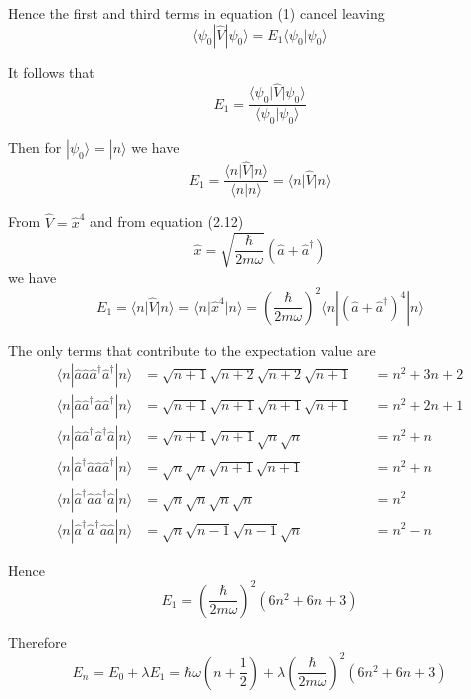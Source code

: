 \documentclass[12pt]{article}
\begin{document}
Hence the first and third terms in equation (1) cancel leaving
\begin{equation*}
\langle\psi_0|\hat V|\psi_0\rangle
=E_1\langle\psi_0|\psi_0\rangle
\end{equation*}

It follows that
\begin{equation*}
E_1=\frac{\langle\psi_0\vert\hat V\vert\psi_0\rangle}{\langle\psi_0\vert\psi_0\rangle}
\end{equation*}

Then for $|\psi_0\rangle=|n\rangle$ we have
\begin{equation*}
E_1=\frac{\langle n\vert\hat V\vert n\rangle}{\langle n\vert n\rangle}
=\langle n\vert\hat V\vert n\rangle
\end{equation*}

From $\hat V=\hat x^4$ and from equation (2.12)
\begin{equation*}
\hat x=\sqrt{\frac{\hbar}{2m\omega}}\left(\hat a+\hat a^\dag\right)
\tag{2.12}
\end{equation*}
we have
\begin{equation*}
E_1=\langle n\vert\hat V\vert n\rangle
=\langle n\vert\hat x^4\vert n\rangle
=\left(\frac{\hbar}{2m\omega}\right)^2
\langle n|\left(\hat a+\hat a^\dag\right)^4|n\rangle
\end{equation*}

The only terms that contribute to the expectation value are
\begin{align*}
\langle n|\hat a\hat a\hat a^\dag\hat a^\dag|n\rangle
&=\sqrt{n+1}\sqrt{n+2}\sqrt{n+2}\sqrt{n+1}
& {}&=n^2+3n+2
\\
\langle n|\hat a\hat a^\dag\hat a\hat a^\dag|n\rangle
&=\sqrt{n+1}\sqrt{n+1}\sqrt{n+1}\sqrt{n+1}
& {}&=n^2+2n+1
\\
\langle n|\hat a\hat a^\dag\hat a^\dag\hat a|n\rangle
&=\sqrt{n + 1}\sqrt{n + 1}\sqrt{n}\sqrt{n}
& {}&=n^2+n
\\
\langle n|\hat a^\dag\hat a\hat a\hat a^\dag|n\rangle
&=\sqrt{n}\sqrt{n}\sqrt{n+1}\sqrt{n+1}
& {}&=n^2+n
\\
\langle n|\hat a^\dag\hat a\hat a^\dag\hat a|n\rangle
&=\sqrt{n}\sqrt{n}\sqrt{n}\sqrt{n}
& {}&=n^2
\\
\langle n|\hat a^\dag\hat a^\dag\hat a\hat a|n\rangle
&=\sqrt{n}\sqrt{n-1}\sqrt{n-1}\sqrt{n}
& {}&=n^2-n
\end{align*}

Hence
\begin{equation*}
E_1=\left(\frac{\hbar}{2m\omega}\right)^2\left(6n^2+6n+3\right)
\end{equation*}

Therefore
\begin{equation*}
E_n=E_0+\lambda E_1=\hbar\omega\left(n+\frac{1}{2}\right)
+\lambda\left(\frac{\hbar}{2m\omega}\right)^2\left(6n^2+6n+3\right)
\end{equation*}
\end{document}
